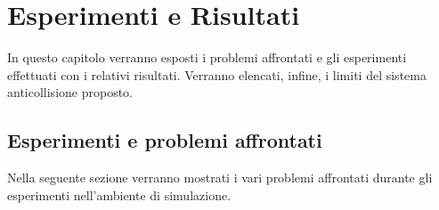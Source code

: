 \chapter{Esperimenti e Risultati}
\label{esperimenti}

In questo capitolo verranno esposti i problemi affrontati e gli esperimenti effettuati con i relativi risultati. Verranno elencati, infine, i limiti del sistema anticollisione proposto.

\section{Esperimenti e problemi affrontati}

Nella seguente sezione verranno mostrati i vari problemi affrontati durante gli esperimenti nell'ambiente di simulazione.

